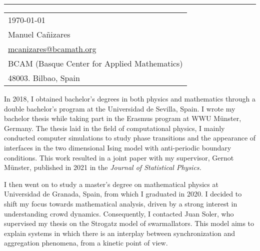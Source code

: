 \documentclass{article}
\begin{document}


\vspace{-1em} %

\rule{\linewidth}{1pt} %



\hfill
\begin{tabular}{l @{}}
\hfill \today \bigskip\\ %
\hfill Manuel Ca\~{n}izares \\
\hfill \href{mailto:mcanizares@bcamath.org}{mcanizares@bcamath.org}\\
\hfill BCAM (Basque Center for Applied Mathematics)\\
\hfill 48003. Bilbao, Spain \\ %
\end{tabular}

\bigskip %



In 2018, I obtained bachelor's degrees in both physics and mathematics through a double bachelor's program at the Universidad de Sevilla, Spain. I wrote my bachelor thesis while taking part in the Erasmus program at WWU M\"{u}nster, Germany. The thesis laid in the field of computational physics, I mainly conducted computer simulations to study phase transitions and the appearance of interfaces in the two dimensional Ising model with anti-periodic boundary conditions. This work resulted in a joint paper with my supervisor, Gernot M\"unster, published in 2021 in the \textit{Journal of Statistical Physics.}

I then went on to study a master's degree on mathematical physics at Universidad de Granada, Spain, from which I graduated in 2020. I decided to shift my focus towards mathematical analysis, driven by a strong interest in understanding crowd dynamics.  Consequently, I contacted Juan Soler, who supervised my thesis on the Strogatz model of swarmallators. This model aims to explain systems in which there is an interplay between synchronization and aggregation phenomena, from a kinetic point of view.
\end{document}
